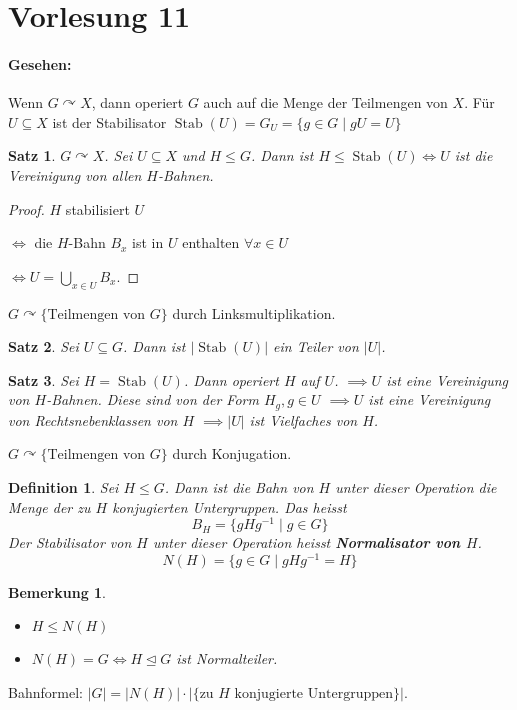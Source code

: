 \documentclass{article}
\theoremstyle{plain}
\newtheorem{definition}{Definition}
\newtheorem{theorem}{Satz}
\newtheorem{bemerkung}{Bemerkung}
\newcommand{\defn}[1]{\textbf{#1}}
\newcommand{\ug}{\leq}
\newcommand{\normal}{\trianglelefteq}
\newcommand{\stab}{\mathop\text{Stab}}
\newcommand{\operateson}{\curvearrowright}
\begin{document}
\section*{Vorlesung 11}
\paragraph{Gesehen:} Wenn $G\operateson X$, dann operiert $G$ auch auf die Menge der Teilmengen von $X$.
Für $U\subseteq X$ ist der Stabilisator $\stab(U)=G_U=\{g\in G\mid gU=U\}$

\begin{theorem}
    $G \operateson X$. Sei $U\subseteq X$ und $H\ug G$. Dann ist $H\ug \stab(U) \Leftrightarrow U$ ist die Vereinigung von allen $H$-Bahnen. 
\end{theorem}
\begin{proof}
    $H$ stabilisiert $U $
    
    $\Leftrightarrow$ die $H$-Bahn $B_x$ ist in $U$ enthalten $\forall x\in U$ 
    
    $\Leftrightarrow U=\bigcup\limits_{x\in U}B_x$.
\end{proof}
$G\operateson \{ \text{Teilmengen von } G\}$ durch Linksmultiplikation.

\begin{theorem}
    Sei $U\subseteq G$. Dann ist $|\stab(U)|$ ein Teiler von $|U|$.
\end{theorem}
\begin{theorem}
    Sei $H=\stab(U)$. Dann operiert $H$ auf $U$.
    $\implies U$ ist eine Vereinigung von $H$-Bahnen. Diese sind von der Form $H_g, g\in U$ $\implies U$ ist eine Vereinigung von Rechtsnebenklassen von $H$ 
    $\implies |U|$ ist Vielfaches von $H$.
\end{theorem}

$G\operateson \{\text{Teilmengen von }G\}$ durch Konjugation.

\begin{definition}
    Sei $H\ug G$. Dann ist die Bahn von $H$ unter dieser Operation die Menge der zu $H$ konjugierten Untergruppen.
    Das heisst
    $$B_H=\{gHg^{-1}\mid g\in G\}$$
    Der Stabilisator von $H$ unter dieser Operation heisst \defn{Normalisator von $H$}.
    $$N(H)=\{g\in G\mid gHg^{-1}=H\}$$
\end{definition}
\begin{bemerkung}
    \quad
    \begin{itemize}
        \item $H\ug N(H)$
        \item $N(H)=G \Leftrightarrow H\normal G$ ist Normalteiler.
    \end{itemize}
\end{bemerkung}
Bahnformel: $|G|=|N(H)|\cdot|\{\text{zu } H \text{ konjugierte Untergruppen}\}|$.
\end{document}
